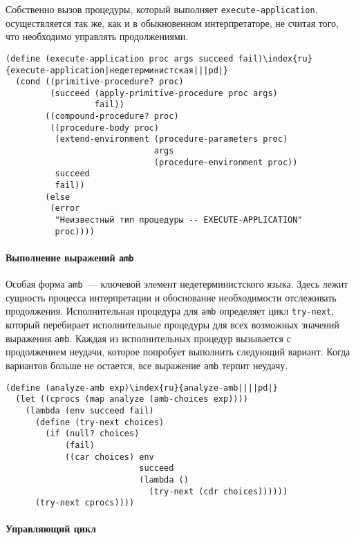 Собственно вызов процедуры, который выполняет
{\tt execute-application}, осуществляется так же, как и
в обыкновенном интерпретаторе, не считая того, что необходимо управлять
продолжениями.

\begin{Verbatim}[fontsize=\small]
(define (execute-application proc args succeed fail)\index{ru}{execute-application|недетерминистская|||pd|}
  (cond ((primitive-procedure? proc)
         (succeed (apply-primitive-procedure proc args)
                  fail))
        ((compound-procedure? proc)
         ((procedure-body proc)
          (extend-environment (procedure-parameters proc)
                              args
                              (procedure-environment proc))
          succeed
          fail))
        (else
         (error
          "Неизвестный тип процедуры -- EXECUTE-APPLICATION"
          proc))))
\end{Verbatim}

\paragraph{Выполнение выражений {\tt amb}}


Особая форма {\tt amb}~--- 
ключевой элемент
недетерминистского языка.  Здесь лежит сущность процесса интерпретации
и обоснование необходимости отслеживать продолжения.  Исполнительная 
процедура для {\tt amb} определяет цикл {\tt try-next}, который
перебирает исполнительные процедуры для всех возможных значений
выражения {\tt amb}.  Каждая из исполнительных процедур
вызывается с продолжением неудачи, которое попробует выполнить
следующий вариант.  Когда вариантов больше не остается, все выражение
{\tt amb} терпит неудачу.

\begin{Verbatim}[fontsize=\small]
(define (analyze-amb exp)\index{ru}{analyze-amb||||pd|}
  (let ((cprocs (map analyze (amb-choices exp))))
    (lambda (env succeed fail)
      (define (try-next choices)
        (if (null? choices)
            (fail)
            ((car choices) env
                           succeed
                           (lambda ()
                             (try-next (cdr choices))))))
      (try-next cprocs))))
\end{Verbatim}

\paragraph{Управляющий цикл}

